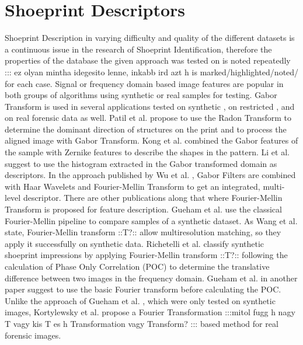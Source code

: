 \documentclass[draft,final]{vutinfth} %
\begin{document}
\section*{Shoeprint Descriptors}
\par
Shoeprint Description  in varying difficulty and quality of the different datasets is a continuous issue in the research of Shoeprint Identification, therefore the properties of the database the given approach was tested on is noted repeatedly ::: ez olyan mintha idegesito lenne, inkabb ird azt h is marked/highlighted/noted/ for each case.
Signal or frequency domain based image features are popular in both groups of algorithms using synthetic or real samples for testing.
Gabor Transform is used in several applications tested on synthetic \cite{patil2009rotation}, on restricted \cite{kong2014novel}, \cite{li2014retrieval} and on real forensic data \cite{wu2019crime} as well.
Patil et al. \cite{patil2009rotation} propose to use the Radon Transform to determine the dominant direction of structures on the print and to process the aligned image with Gabor Transform.
Kong et al.  \cite{kong2014novel} combined the Gabor features of the sample with Zernike features to describe the shapes in the pattern.
Li et al. \cite{li2014retrieval} suggest to use the histogram extracted in the Gabor transformed domain as descriptors.
In the approach published by Wu et al.  \cite{wu2019crime}, Gabor Filters are combined with Haar Wavelets and Fourier-Mellin Transform to get an integrated, multi-level descriptor. 
There are other publications along that where Fourier-Mellin Transform is proposed for feature description.
Gueham et al. \cite{gueham2008automatic} use the classical Fourier-Mellin pipeline to compare samples of a synthetic dataset.
As Wang et al. \cite{wang2014automatic} state, Fourier-Mellin transform ::T?:: allow multiresolution matching, so they apply it successfully on synthetic data.
Richetelli et al. \cite{richetelli2017classification} classify synthetic shoeprint impressions by applying Fourier-Mellin transform ::T?:: following the calculation of Phase Only Correlation (POC) to determine the translative difference between two images in the frequency domain.
Gueham et al. \cite{gueham2007automatic} in another paper suggest to use the basic Fourier transform before calculating the POC.
Unlike the approach of Gueham et al. \cite{gueham2007automatic}, which were only tested on synthetic images, Kortylewsky et al. \cite{kortylewski2014unsupervised} propose a Fourier Transformation :::mitol fugg h nagy T vagy kis T es h Transformation vagy Transform? ::: based method for real forensic images.
\end{document}
